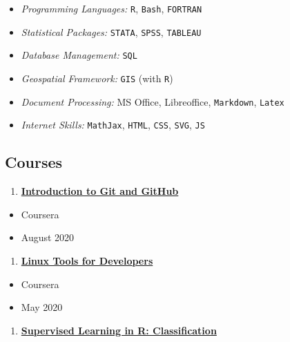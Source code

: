 \documentclass[
]{book}
\providecommand{\tightlist}{%
  \setlength{\itemsep}{0pt}\setlength{\parskip}{0pt}}
\begin{document}
\begin{itemize}
\tightlist
\item
  \emph{Programming Languages:} \texttt{R}, \texttt{Bash}, \texttt{FORTRAN}
\item
  \emph{Statistical Packages:} \texttt{STATA}, \texttt{SPSS}, \texttt{TABLEAU}
\item
  \emph{Database Management:} \texttt{SQL}
\item
  \emph{Geospatial Framework:} \texttt{GIS} (with \texttt{R})
\item
  \emph{Document Processing:} MS Office, Libreoffice, \texttt{Markdown}, \texttt{Latex}
\item
  \emph{Internet Skills:} \texttt{MathJax}, \texttt{HTML}, \texttt{CSS}, \texttt{SVG}, \texttt{JS}
\end{itemize}

\hypertarget{courses}{%
\subsection*{Courses}\label{courses}}

\begin{enumerate}
\def\labelenumi{\arabic{enumi}.}
\tightlist
\item
  \href{https://www.coursera.org/learn/introduction-git-github/home/welcome}{\textbf{Introduction to Git and GitHub}}
\end{enumerate}

\begin{itemize}
\tightlist
\item
  Coursera
\item
  August 2020
\end{itemize}

\begin{enumerate}
\def\labelenumi{\arabic{enumi}.}
\setcounter{enumi}{1}
\tightlist
\item
  \href{https://www.coursera.org/learn/linux-tools-for-developers/home/welcome}{\textbf{Linux Tools for Developers}}
\end{enumerate}

\begin{itemize}
\tightlist
\item
  Coursera
\item
  May 2020
\end{itemize}

\begin{enumerate}
\def\labelenumi{\arabic{enumi}.}
\setcounter{enumi}{2}
\tightlist
\item
  \href{https://www.datacamp.com/courses/supervised-learning-in-r-classification}{\textbf{Supervised Learning in R: Classification}}
\end{enumerate}
\end{document}
